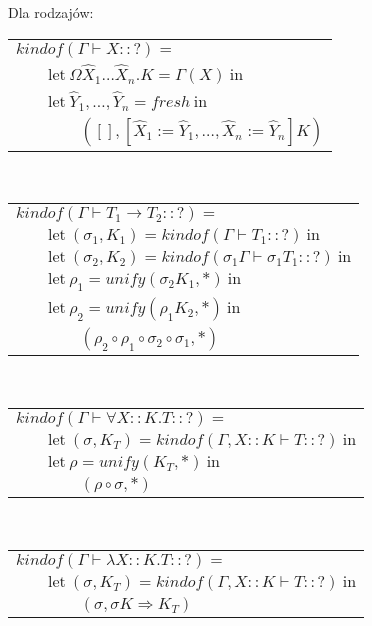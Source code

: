\documentclass[11pt,leqno]{article}
\begin{document}
Dla rodzajów: \\
\begin{tabular}{l}
$kindof(\Gamma \vdash X :: ?) = $ \\
$\qquad \textrm{let} \ \Omega \widehat{X}_1 \dots \widehat{X}_n.K = \Gamma(X) \ \textrm{in} $ \\
$\qquad \textrm{let} \ \widehat{Y}_1, \dots, \widehat{Y}_n = fresh \ \textrm{in} $ \\
$\qquad\qquad ([], [\widehat{X}_1 := \widehat{Y}_1, \dots ,\widehat{X}_n := \widehat{Y}_n]K) $ \\
\end{tabular} \\
\begin{tabular}{l}
$kindof(\Gamma \vdash T_1 \rightarrow T_2 :: ?) = $ \\
$\qquad \textrm{let} \ (\sigma_1, K_1) = kindof(\Gamma \vdash T_1 :: ?) \ \textrm{in} $ \\
$\qquad \textrm{let} \ (\sigma_2, K_2) = kindof(\sigma_1 \Gamma \vdash \sigma_1 T_1 :: ?) \ \textrm{in} $ \\
$\qquad \textrm{let} \ \rho_1 = unify(\sigma_2 K_1, *) \ \textrm{in} $ \\
$\qquad \textrm{let} \ \rho_2 = unify(\rho_1 K_2, *) \ \textrm{in} $ \\
$\qquad\qquad (\rho_2 \circ \rho_1 \circ \sigma_2 \circ \sigma_1, *) $ \\
\end{tabular} \\
\begin{tabular}{l}
$kindof(\Gamma \vdash \forall X::K.T :: ?) = $ \\
$\qquad \textrm{let} \ (\sigma, K_T) = kindof(\Gamma, X::K \vdash T :: ?) \ \textrm{in} $ \\
$\qquad \textrm{let} \ \rho = unify(K_T, *) \ \textrm{in} $ \\
$\qquad\qquad (\rho \circ \sigma, *) $ \\
\end{tabular} \\
\begin{tabular}{l}
$kindof(\Gamma \vdash \lambda X::K.T :: ?) = $ \\
$\qquad \textrm{let} \ (\sigma, K_T) = kindof(\Gamma, X::K \vdash T :: ?) \ \textrm{in} $ \\
$\qquad\qquad (\sigma, \sigma K \Rightarrow K_T) $ \\
\end{tabular} \\
\end{document}
